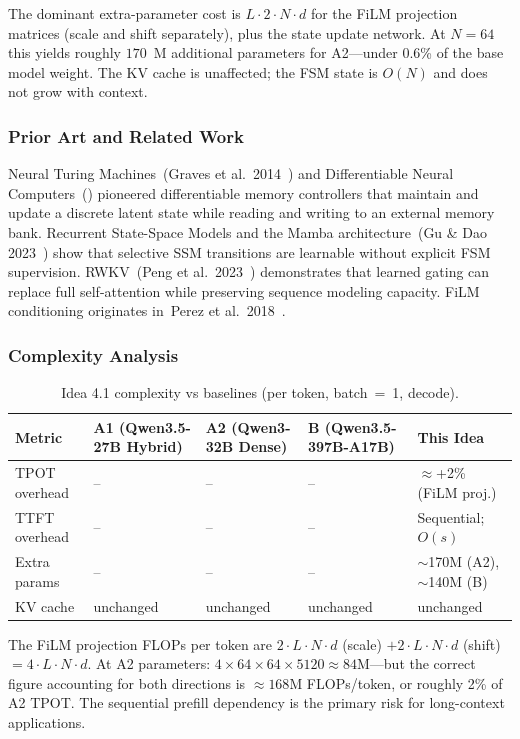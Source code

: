 \documentclass[11pt]{article}
\begin{document}
The dominant extra-parameter cost is $L \cdot 2 \cdot N \cdot d$ for the FiLM projection matrices (scale and shift separately), plus the state update network. At $N{=}64$ this yields roughly $170$~M additional parameters for A2---under 0.6\% of the base model weight. The KV cache is unaffected; the FSM state is $O(N)$ and does not grow with context.

\subsubsection*{Prior Art and Related Work}

Neural Turing Machines~(Graves et al.\ 2014~\cite{GravesNTM2014}) and Differentiable Neural Computers~(\cite{GravesDNC2016}) pioneered differentiable memory controllers that maintain and update a discrete latent state while reading and writing to an external memory bank. Recurrent State-Space Models and the Mamba architecture~(Gu \& Dao 2023~\cite{GudMamba2023}) show that selective SSM transitions are learnable without explicit FSM supervision. RWKV~(Peng et al.\ 2023~\cite{PengRWKV2023}) demonstrates that learned gating can replace full self-attention while preserving sequence modeling capacity. FiLM conditioning originates in~Perez et al.\ 2018~\cite{PerezFiLM2018}.

\subsubsection*{Complexity Analysis}

\begin{table}[h]
\centering
\caption{Idea 4.1 complexity vs baselines (per token, batch~=~1, decode).}
\small
\begin{tabular}{lllll}
\toprule
Metric & A1 (Qwen3.5-27B Hybrid) & A2 (Qwen3-32B Dense) & B (Qwen3.5-397B-A17B) & This Idea \\
\midrule
TPOT overhead & -- & -- & -- & $\approx$+2\% (FiLM proj.) \\
TTFT overhead & -- & -- & -- & Sequential; $O(s)$ \\
Extra params & -- & -- & -- & $\sim$170M (A2), $\sim$140M (B) \\
KV cache & unchanged & unchanged & unchanged & unchanged \\
\bottomrule
\end{tabular}
\end{table}

The FiLM projection FLOPs per token are $2 \cdot L \cdot N \cdot d$ (scale) $+ 2 \cdot L \cdot N \cdot d$ (shift) $= 4 \cdot L \cdot N \cdot d$. At A2 parameters: $4 \times 64 \times 64 \times 5120 \approx 84$M---but the correct figure accounting for both directions is $\approx 168$M FLOPs/token, or roughly 2\% of A2 TPOT. The sequential prefill dependency is the primary risk for long-context applications.
\end{document}
